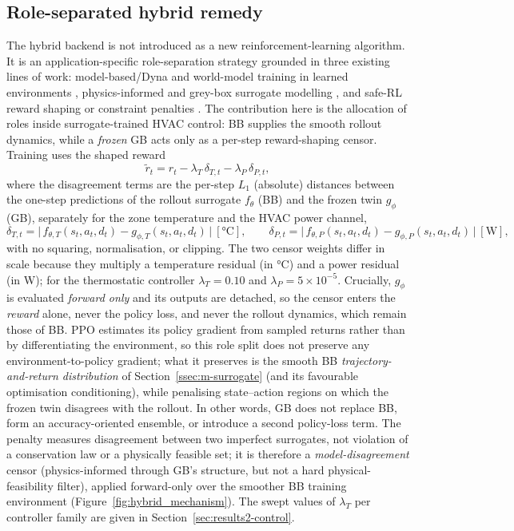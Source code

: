 \documentclass[a4paper,fleqn]{cas-sc}
\begin{document}
\subsection{Role-separated hybrid remedy}\label{ssec:m-hybrid}
The hybrid backend is not introduced as a new reinforcement-learning algorithm.
It is an application-specific role-separation strategy grounded in three existing
lines of work: model-based/Dyna and world-model training in learned environments
\citep{Sutton1991Dyna,Hafner2025Dreamer}, physics-informed and grey-box surrogate
modelling \citep{Bacher2011RCIdentification,Raissi2019PINN,Karpatne2017TheoryGuided,Willard2022PIML},
and safe-RL reward shaping or constraint penalties \citep{Garcia2015SafeRL,Wang2025SafeDRL}.
The contribution here is the allocation of roles inside surrogate-trained HVAC
control: BB supplies the smooth rollout dynamics, while a \emph{frozen} GB acts
only as a per-step reward-shaping censor. Training uses the shaped reward
\begin{equation}
\tilde{r}_t = r_t - \lambda_T\,\delta_{T,t} - \lambda_P\,\delta_{P,t},
\label{eq:m-hybrid}
\end{equation}
where the disagreement terms are the per-step $L_1$ (absolute) distances between the
one-step predictions of the rollout surrogate $f_\theta$ (BB) and the frozen twin
$g_\phi$ (GB), separately for the zone temperature and the HVAC power channel,
\begin{equation*}
\delta_{T,t} = \big|\, f_{\theta,T}(s_t,a_t,d_t) - g_{\phi,T}(s_t,a_t,d_t)\,\big|\ [\si{\celsius}],
\qquad
\delta_{P,t} = \big|\, f_{\theta,P}(s_t,a_t,d_t) - g_{\phi,P}(s_t,a_t,d_t)\,\big|\ [\si{\watt}],
\end{equation*}
with no squaring, normalisation, or clipping. The two censor weights differ in scale
because they multiply a temperature residual (in \si{\celsius}) and a power residual
(in \si{\watt}); for the thermostatic controller $\lambda_T = 0.10$ and
$\lambda_P = 5\times10^{-5}$. Crucially, $g_\phi$ is evaluated \emph{forward only}
and its outputs are detached, so the censor enters the \emph{reward} alone, never
the policy loss, and never the rollout dynamics, which remain those of BB. PPO
estimates its policy gradient from sampled returns rather than by differentiating
the environment, so this role split does not preserve any environment-to-policy
gradient; what it preserves is the smooth BB \emph{trajectory-and-return
distribution} of Section~\ref{ssec:m-surrogate} (and its favourable optimisation
conditioning), while penalising state--action regions on which the frozen twin
disagrees with the rollout. In other words, GB does not replace BB, form an
accuracy-oriented ensemble, or introduce a second policy-loss term. The penalty
measures disagreement between two imperfect surrogates, not violation of a
conservation law or a physically feasible set; it is therefore a
\emph{model-disagreement} censor (physics-informed through GB's structure, but not
a hard physical-feasibility filter), applied forward-only over the smoother BB
training environment (Figure~\ref{fig:hybrid_mechanism}). The swept values of $\lambda_T$ per controller family are given in
Section~\ref{sec:results2-control}.
\end{document}

